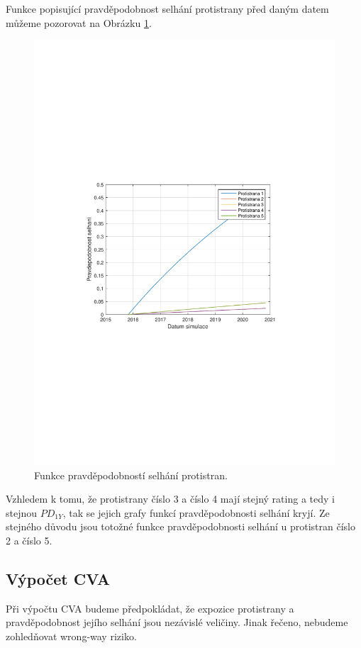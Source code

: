 \documentclass[a4paper,12pt]{report}
\theoremstyle{definition} \newtheorem{definice}[veta]{Definice}
\theoremstyle{remark}
\begin{document}
Funkce popisující pravděpodobnost selhání protistrany před daným datem můžeme pozorovat na Obrázku \ref{DefaultProbability}.
\begin{figure}[!htbp]
  \centering 
	\includegraphics[width=13cm, clip, trim= 100 270 110 270]{IMG/Pravdepodobnost_selhani.pdf}
  \caption{Funkce pravděpodobností selhání protistran.}  \label{DefaultProbability}
\end{figure}
Vzhledem k tomu, že protistrany číslo 3 a číslo 4 mají stejný rating a tedy i stejnou $PD_{1Y}$, tak se jejich grafy funkcí pravděpodobnosti selhání kryjí.
Ze stejného důvodu jsou totožné funkce pravděpodobnosti selhání u protistran číslo 2 a číslo 5.

\subsection{Výpočet CVA} \label{vypocetCVA_kap}
Při výpočtu CVA budeme předpokládat, že expozice protistrany a pravděpodobnost jejího selhání jsou nezávislé veličiny.
Jinak řečeno, nebudeme zohledňovat wrong-way riziko.
\end{document}
